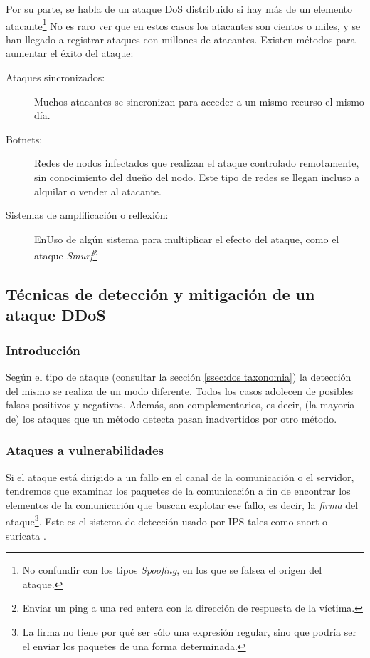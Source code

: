 Por su parte, se habla de un ataque \gls{DoS} distribuido si hay más de un elemento 
atacante\footnote{No confundir con los tipos \emph{Spoofing}, en los que se falsea el origen del ataque.} 
No es raro ver que en estos casos los atacantes son cientos o miles, y se han llegado a registrar ataques 
con millones de atacantes. Existen métodos para aumentar el éxito del ataque:
\begin{description}
  \item[Ataques sincronizados:] Muchos atacantes se sincronizan para acceder a un mismo recurso el
  mismo día.
  \item[Botnets:] Redes de nodos infectados que realizan el ataque controlado remotamente, sin conocimiento del
  dueño del nodo. Este tipo de redes se llegan incluso a alquilar o vender al atacante.
  \item[Sistemas de amplificación o reflexión:] EnUso de algún sistema para multiplicar el efecto del ataque,
  como el ataque \emph{Smurf}\footnote{Enviar un ping a una red entera con la dirección de respuesta 
  de la víctima.}
\end{description}

\subsection{Técnicas de detección y mitigación de un ataque DDoS}\label{sec:dos Deteccion y mitigación}
\subsubsection{Introducción}
Según el tipo de ataque (consultar la sección \ref{ssec:dos taxonomia}) la detección del mismo se realiza de un modo diferente.
Todos los casos adolecen de posibles falsos positivos y negativos. Además, son complementarios, es decir, (la mayoría de) los
ataques que un método detecta pasan inadvertidos por otro método.

\subsubsection{Ataques a vulnerabilidades}
Si el ataque está dirigido a un fallo en el canal de la comunicación o el servidor,
tendremos que examinar los paquetes de la comunicación a fin de encontrar los elementos de la
comunicación que buscan explotar ese fallo, es decir, la \emph{firma} del ataque\footnote{La firma no tiene
por qué ser sólo una expresión regular, sino que podría ser el enviar los paquetes de una forma determinada.}.
Este es el sistema de detección usado por IPS tales como snort \cite{snort} o suricata \cite{suricata}.


